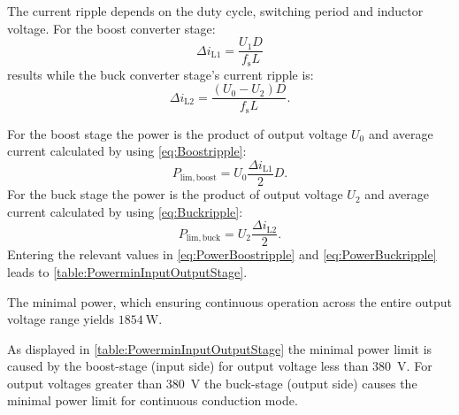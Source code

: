 
\begin{solutionblock}
    The current ripple depends on the duty cycle, switching period and inductor voltage.
    For the boost converter stage:
    \begin{equation}
        \Delta i_\mathrm{L1}=\frac{U_\mathrm{1}D}{f_\mathrm{s}L}
        \label{eq:Boostripple}
    \end{equation}
    results while the buck converter stage's current ripple is:
    \begin{equation}
        \Delta i_\mathrm{L2}=\frac{\left(U_\mathrm{0}-U_\mathrm{2}\right)D}{f_\mathrm{s}L}.
        \label{eq:Buckripple}
    \end{equation}
\end{solutionblock}


\begin{solutionblock}
    For the boost stage the power is the product of output voltage
     $U_\mathrm{0}$ and average current calculated by using \eqref{eq:Boostripple}:
    \begin{equation}
        P_\mathrm{lim,boost}=U_\mathrm{0}\frac{\Delta i_\mathrm{L1}}{2}D.
        \label{eq:PowerBoostripple}
    \end{equation}
    For the buck stage the power is the product of output voltage
    $U_\mathrm{2}$ and average current calculated by using \eqref{eq:Buckripple}:
    \begin{equation}
        P_\mathrm{lim,buck}=U_\mathrm{2}\frac{\Delta i_\mathrm{L2}}{2}.
        \label{eq:PowerBuckripple}
    \end{equation}
    Entering the relevant values in \eqref{eq:PowerBoostripple} and \eqref{eq:PowerBuckripple} leads to \autoref{table:PowerminInputOutputStage}.
    
    The minimal power, which ensuring continuous operation across the entire output voltage range
    yields  $\SI{1854}{\watt}$.
\end{solutionblock}

\begin{solutionblock}
    As displayed in \autoref{table:PowerminInputOutputStage} the minimal power limit is caused by the 
    boost-stage (input side) for output voltage less than \SI{380}{\volt}. For output voltages greater than \SI{380}{\volt} 
    the buck-stage (output side) causes the minimal power limit for continuous conduction mode.
\end{solutionblock}

